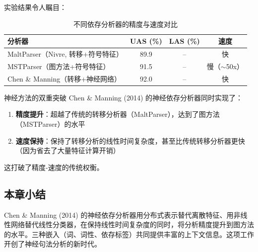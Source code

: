 实验结果令人瞩目：

\begin{table}[H]
\centering
\begin{tabular}{lccc}
\toprule
\textbf{分析器} & \textbf{UAS (\%)} & \textbf{LAS (\%)} & \textbf{速度} \\
\midrule
MaltParser（Nivre, 转移+符号特征） & 89.9 & -- & 快 \\
MSTParser（图方法+符号特征） & 91.5 & -- & 慢（$\sim$50x） \\
Chen \& Manning（转移+神经网络） & 92.0 & -- & 快 \\
\bottomrule
\end{tabular}
\caption{不同依存分析器的精度与速度对比}
\end{table}

\begin{importantbox}{神经方法的双重突破}
Chen \& Manning (2014) 的神经依存分析器同时实现了：
\begin{enumerate}
    \item \textbf{精度提升}：超越了传统的转移分析器（MaltParser），达到了图方法（MSTParser）的水平
    \item \textbf{速度保持}：保持了转移分析的线性时间复杂度，甚至比传统转移分析器更快（因为省去了大量特征计算开销）
\end{enumerate}
这打破了精度-速度的传统权衡。
\end{importantbox}

\subsection{本章小结}

Chen \& Manning (2014) 的神经依存分析器用分布式表示替代离散特征、用非线性网络替代线性分类器，在保持线性时间复杂度的同时，将分析精度提升到图方法的水平。三种嵌入（词、词性、依存标签）共同提供丰富的上下文信息。这项工作开创了神经句法分析的新时代。


